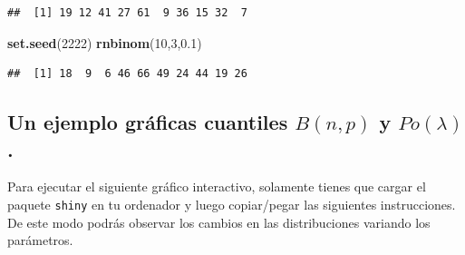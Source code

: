 \documentclass[]{book}
\newenvironment{Shaded}{\begin{snugshade}}{\end{snugshade}}
\newcommand{\DecValTok}[1]{\textcolor[rgb]{0.00,0.00,0.81}{#1}}
\newcommand{\FloatTok}[1]{\textcolor[rgb]{0.00,0.00,0.81}{#1}}
\newcommand{\KeywordTok}[1]{\textcolor[rgb]{0.13,0.29,0.53}{\textbf{#1}}}
\newcommand{\NormalTok}[1]{#1}
\begin{document}
\begin{verbatim}
##  [1] 19 12 41 27 61  9 36 15 32  7
\end{verbatim}

\begin{Shaded}
\begin{Highlighting}[]
\KeywordTok{set.seed}\NormalTok{(}\DecValTok{2222}\NormalTok{)}
\KeywordTok{rnbinom}\NormalTok{(}\DecValTok{10}\NormalTok{,}\DecValTok{3}\NormalTok{,}\FloatTok{0.1}\NormalTok{)}
\end{Highlighting}
\end{Shaded}

\begin{verbatim}
##  [1] 18  9  6 46 66 49 24 44 19 26
\end{verbatim}

\hypertarget{un-ejemplo-gruxe1ficas-cuantiles-bnp-y-polambda.}{%
\subsection{\texorpdfstring{Un ejemplo gráficas cuantiles \(B(n,p)\) y \(Po(\lambda)\).}{Un ejemplo gráficas cuantiles B(n,p) y Po(\textbackslash{}lambda).}}\label{un-ejemplo-gruxe1ficas-cuantiles-bnp-y-polambda.}}

Para ejecutar el siguiente gráfico interactivo, solamente tienes que cargar el paquete \texttt{shiny} en tu ordenador y luego copiar/pegar las siguientes instrucciones. De este modo podrás observar los cambios en las distribuciones variando los parámetros.
\end{document}

